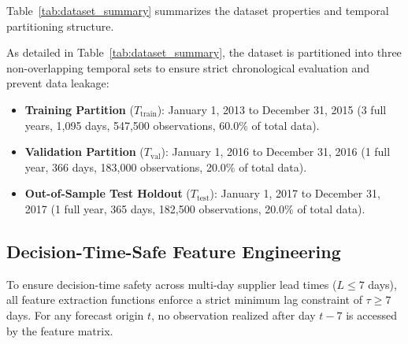 Table~\ref{tab:dataset_summary} summarizes the dataset properties and temporal partitioning structure.

\begin{table}[htbp]
\centering
\caption{Dataset Summary and Chronological Partitioning Structure}
\label{tab:dataset_summary}
\small
{}
\end{table}

As detailed in Table~\ref{tab:dataset_summary}, the dataset is partitioned into three non-overlapping temporal sets to ensure strict chronological evaluation and prevent data leakage:

\begin{itemize}
    \item \textbf{Training Partition} ($T_{\text{train}}$): January 1, 2013 to December 31, 2015 (3 full years, 1,095 days, 547,500 observations, 60.0\% of total data).
    \item \textbf{Validation Partition} ($T_{\text{val}}$): January 1, 2016 to December 31, 2016 (1 full year, 366 days, 183,000 observations, 20.0\% of total data).
    \item \textbf{Out-of-Sample Test Holdout} ($T_{\text{test}}$): January 1, 2017 to December 31, 2017 (1 full year, 365 days, 182,500 observations, 20.0\% of total data).
\end{itemize}

\subsection{Decision-Time-Safe Feature Engineering}
To ensure decision-time safety across multi-day supplier lead times ($L \le 7$ days), all feature extraction functions enforce a strict minimum lag constraint of $\tau \ge 7$ days. For any forecast origin $t$, no observation realized after day $t-7$ is accessed by the feature matrix.

